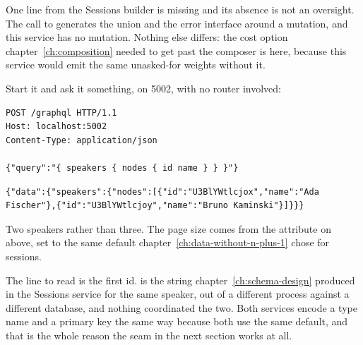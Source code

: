 %
One line from the Sessions builder is missing and its absence is not an
oversight. The call to
generates the union and the error interface around a mutation, and this
service has no mutation. Nothing else differs: the cost option
chapter~\ref{ch:composition} needed to get past the composer is here, because
this service would emit the same unasked-for  weights without it.

%
Start it and ask it something, on 5002, with no router involved:

\begin{verbatim}
POST /graphql HTTP/1.1
Host: localhost:5002
Content-Type: application/json

{"query":"{ speakers { nodes { id name } } }"}
\end{verbatim}

\begin{verbatim}
{"data":{"speakers":{"nodes":[{"id":"U3BlYWtlcjox","name":"Ada Fischer"},{"id":"U3BlYWtlcjoy","name":"Bruno Kaminski"}]}}}
\end{verbatim}

Two speakers rather than three. The page size comes from the attribute on
 above, set to the same default
chapter~\ref{ch:data-without-n-plus-1} chose for sessions.

%
The line to read is the first id.  is the string chapter~\ref{ch:schema-design} produced
in the Sessions service for the same speaker, out of a different process
against a different database, and nothing coordinated the two. Both services
encode a type name and a primary key the same way because both use the same
default, and that is the whole reason the seam in the next section works at
all.
%
